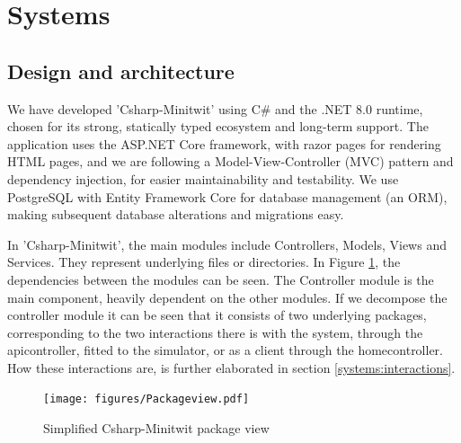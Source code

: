 \section{Systems}
\subsection{Design and architecture} \label{Design of the CSharp-MiniTwit application}


We have developed 'Csharp-Minitwit' using C\# and the .NET 8.0 runtime, chosen for its strong, statically typed ecosystem and long-term support.\cite{netcoresupport} The application uses the ASP.NET Core framework\cite{aspnetcoreintro2023}, with razor pages for rendering HTML pages, and we are following a Model-View-Controller (MVC) pattern and dependency injection, for easier maintainability and testability. We use PostgreSQL with Entity Framework Core for database management (an ORM), making subsequent database alterations and migrations easy.  

In 'Csharp-Minitwit', the main modules include Controllers, Models, Views and Services. They represent underlying files or directories.  In Figure \ref{fig:packageview}, the dependencies between the modules can be seen. The Controller module is the main component, heavily dependent on the other modules. If we decompose the controller module it can be seen that it consists of two underlying packages, corresponding to the two interactions there is with the system, through the apicontroller, fitted to the simulator, or as a client through the homecontroller. How these interactions are, is further elaborated in section \ref{systems:interactions}. 

\begin{figure}[H]
    \centering
    \texttt{[image: figures/Packageview.pdf]}
    \caption{Simplified Csharp-Minitwit package view}
    \label{fig:packageview}
\end{figure}


